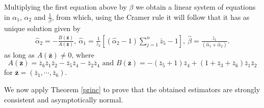 \documentclass[12pt]{article} %
\newcommand{\bs}{\boldsymbol}
\theoremstyle{definition}
\begin{document}
Multiplying the first equation above by $\beta$ we obtain a linear system of equations in $\alpha_1$, $\alpha_2$ and $\frac{1}{\beta}$, from which, using the Cramer rule it will follow that it has as unique solution given by
\begin{align*}
\hat{\alpha}_2 = -\frac{B(\bs{\bar{z}})}{A(\bs{\bar{z}})}, \
\hat{\alpha}_1 = \frac{1}{\bar{z}_2} \left[ (\hat{\alpha}_2 - 1) \sum_{j=1}^{n} \bar{z}_5 - 1 \right], \
\hat{\beta} = \frac{\bar{z}_1}{ (\hat{\alpha}_1 + \hat{\alpha}_2)}.
\end{align*}
as long as $A(\bs{\bar{z}})\neq 0$, where
\begin{equation*}A(\bs{\bar{z}})=\bar{z}_6\bar{z}_1\bar{z}_2-\bar{z}_5\bar{z}_4-\bar{z}_2\bar{z}_4\mbox{ and }B(\bs{\bar{z}}) = -(\bar{z}_5+1)\bar{z}_4 + (1+\bar{z}_3+\bar{z}_6)\bar{z}_1\bar{z}_2
\end{equation*}
for $\bs{\bar{z}}=\left(\bar{z}_1,\cdots,\bar{z}_6\right)$.

We now apply Theorem \ref{princ} to prove that the obtained estimators are strongly consistent and asymptotically normal.
\end{document}
